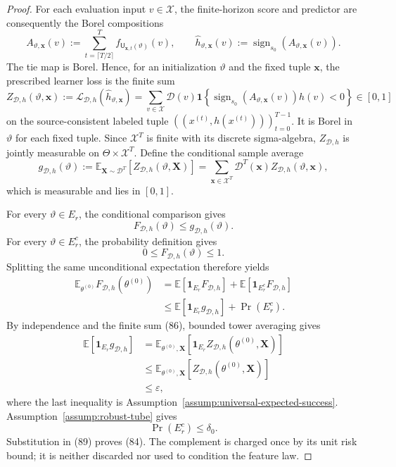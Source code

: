 \begin{proof}
For each evaluation input $v\in\mathcal X$, the finite-horizon score and
predictor are consequently the Borel compositions
\[
A_{\vartheta,\mathbf x}(v)
:=\sum_{t=\lceil T/2\rceil}^{T}
f_{\mathsf U_{\mathbf x,t}(\vartheta)}(v),
\qquad
\widehat h_{\vartheta,\mathbf x}(v)
:=\operatorname{sign}_{s_0}(A_{\vartheta,\mathbf x}(v)).
\]
The tie map is Borel.  Hence, for an initialization $\vartheta$ and the fixed
tuple $\mathbf x$, the prescribed learner loss is the finite sum
\[
Z_{\mathcal D,h}(\vartheta,\mathbf x):=
\mathcal L_{\mathcal D,h}(\widehat h_{\vartheta,\mathbf x})
=\sum_{v\in\mathcal X}\mathcal D(v)
\mathbf1\!\left\{
\operatorname{sign}_{s_0}(A_{\vartheta,\mathbf x}(v))h(v)<0
\right\}\in[0,1]
\tag{85}
\]
on the source-consistent labeled tuple
$((x^{(t)},h(x^{(t)})))_{t=0}^{T-1}$.  It is Borel in $\vartheta$ for each
fixed tuple.  Since $\mathcal X^T$ is finite with its discrete sigma-algebra,
$Z_{\mathcal D,h}$ is jointly measurable on $\Theta\times\mathcal X^T$.
Define the conditional sample average
\[
g_{\mathcal D,h}(\vartheta):=
\mathbb E_{\mathbf X\sim\mathcal D^T}
[Z_{\mathcal D,h}(\vartheta,\mathbf X)]
=\sum_{\mathbf x\in\mathcal X^T}\mathcal D^T(\mathbf x)
Z_{\mathcal D,h}(\vartheta,\mathbf x),
\tag{86}
\]
which is measurable and lies in $[0,1]$.

For every $\vartheta\in E_r$, the conditional comparison gives
\[
F_{\mathcal D,h}(\vartheta)\leq g_{\mathcal D,h}(\vartheta).
\tag{87}
\]
For every $\vartheta\in E_r^c$, the probability definition gives
\[
0\leq F_{\mathcal D,h}(\vartheta)\leq1.
\tag{88}
\]
Splitting the same unconditional expectation therefore yields
\[
\begin{aligned}
\mathbb E_{\theta^{(0)}}F_{\mathcal D,h}(\theta^{(0)})
&=\mathbb E[\mathbf1_{E_r}F_{\mathcal D,h}]
 +\mathbb E[\mathbf1_{E_r^c}F_{\mathcal D,h}]\\
&\leq\mathbb E[\mathbf1_{E_r}g_{\mathcal D,h}]
 +\Pr(E_r^c).
\end{aligned}
\tag{89}
\]
By independence and the finite sum (86), bounded tower averaging gives
\[
\begin{aligned}
\mathbb E[\mathbf1_{E_r}g_{\mathcal D,h}]
&=\mathbb E_{\theta^{(0)},\mathbf X}
[\mathbf1_{E_r}Z_{\mathcal D,h}(\theta^{(0)},\mathbf X)]\\
&\leq\mathbb E_{\theta^{(0)},\mathbf X}
[Z_{\mathcal D,h}(\theta^{(0)},\mathbf X)]\\
&\leq\varepsilon,
\end{aligned}
\tag{90}
\]
where the last inequality is Assumption~\ref{assump:universal-expected-success}.
Assumption~\ref{assump:robust-tube} gives
\[
\Pr(E_r^c)\leq\delta_0.
\tag{91}
\]
Substitution in (89) proves (84).  The complement is charged once by its
unit risk bound; it is neither discarded nor used to condition the feature
law.
\end{proof}

